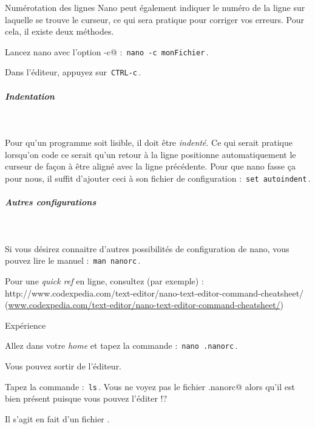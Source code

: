\documentclass[a4paper,11pt]{article}
\begin{document}
			
		\begin{Tutoriel}{Num\'erotation des lignes} 
			Nano peut \'egalement indiquer le num\'ero de la ligne sur laquelle se trouve le curseur, ce qui sera pratique pour corriger vos erreurs. Pour cela,
			il existe deux m\'ethodes.
		
            		\par
        
			\begin{steps}
				\item Lancez nano avec l'option \verb@-c@ : \,\verb|nano -c monFichier|\,.
				\item Dans l'\'editeur, appuyez sur \,\verb|CTRL-c|\,.
			\end{steps}
		\end{Tutoriel}		
			
		\subparagraph{Indentation} 
		
			\textcolor{white}{.} \par
				 
			Pour qu'un programme soit lisible, il doit \^etre \textit{indent\'e}. Ce qui serait pratique lorsqu'on code ce serait qu'un retour \`a la ligne positionne
			automatiquement le curseur de fa\c con \`a \^etre align\'e avec la ligne pr\'ec\'edente. Pour que nano fasse \c ca pour nous, il suffit d'ajouter 
			ceci \`a son fichier de configuration : \,\verb|set autoindent|\,.
		
            		\par
        
			
		\subparagraph{Autres configurations} 
		
			\textcolor{white}{.} \par
				 
			Si vous d\'esirez connaitre d'autres possibilit\'es de configuration de nano, vous pouvez lire le manuel : \,\verb|man nanorc|\,.
		
            		\par
        

			Pour une \textit{quick ref} en ligne, consultez (par exemple) : \\
			http://www.codexpedia.com/text-editor/nano-text-editor-command-cheatsheet/\\
			 (\url{www.codexpedia.com/text-editor/nano-text-editor-command-cheatsheet/})
            		\par
        
			
		\begin{Tutoriel}{Exp\'erience} 
				\begin{steps}
					\item Allez dans votre \textit{home} et tapez la commande : \,\verb|nano .nanorc|\,.
						\par
						Vous pouvez sortir de l'\'editeur.
			
					\item Tapez la commande : \,\verb|ls|\,. Vous ne voyez pas le fichier \verb@.nanorc@ alors qu'il est bien pr\'esent puisque vous
						pouvez l'\'editer !?
						\par
						Il s'agit en fait d'un fichier \verb@caché@.
				\end{steps}
		\end{Tutoriel}
				
\end{document}
